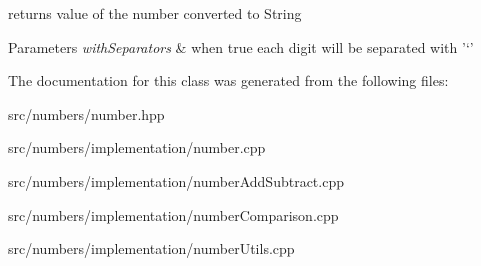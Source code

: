 returns value of the number converted to String 


\begin{DoxyParams}{Parameters}
{\em with\-Separators} & when true each digit will be separated with '`' \\
\hline
\end{DoxyParams}


The documentation for this class was generated from the following files\-:\begin{DoxyCompactItemize}
\item 
src/numbers/number.\-hpp\item 
src/numbers/implementation/number.\-cpp\item 
src/numbers/implementation/number\-Add\-Subtract.\-cpp\item 
src/numbers/implementation/number\-Comparison.\-cpp\item 
src/numbers/implementation/number\-Utils.\-cpp\end{DoxyCompactItemize}
